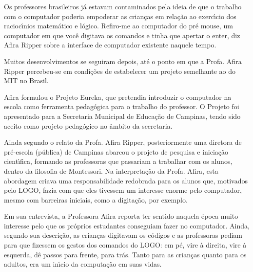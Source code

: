 \documentclass[
12pt,		%
openright,	%
twoside,  %
a4paper,			%
chapter=TITLE,		%
english,			%
french,				%
spanish,			%
brazil				%
]{USPSC-classe/USPSC}
\begin{document}
Os professores brasileiros j\'a estavam contaminados pela ideia de que o trabalho com o computador poderia empoderar as crian\c{c}as em rela\c{c}\~ao ao exerc\'{\i}cio dos racioc\'{\i}nios matem\'atico e l\'ogico. \textquotedbl Refiro-me ao computador do pr\'e mouse, um computador em que voc\^e digitava os comandos e tinha que apertar o enter\textquotedbl , diz Afira Ripper sobre a interface de computador existente naquele tempo.








Muitos desenvolvimentos se seguiram depois, at\'e o ponto em que a Profa. Afira Ripper percebeu-se em condi\c{c}\~oes de estabelecer um projeto semelhante ao do MIT no Brasil.








Afira formulou o Projeto Eureka, que pretendia introduzir o computador na escola como ferramenta pedag\'ogica para o trabalho do professor. O Projeto foi apresentado para a Secretaria Municipal de Educa\c{c}\~ao de Campinas, tendo sido aceito como projeto pedag\'ogico no \^ambito da secretaria.








Ainda segundo o relato da Profa. Afira Ripper, posteriormente uma diretora de pr\'e-escola (p\'ublica) de Campinas abarcou o projeto de pesquisa e inicia\c{c}\~ao cient\'{\i}fica, formando as professoras que passariam a trabalhar com os alunos, dentro da filosofia de Montessori. Na interpreta\c{c}\~ao da Profa. Afira, esta abordagem criava uma responsabilidade redobrada para os alunos que, motivados pelo LOGO, fazia com que eles tivessem um interesse enorme pelo computador, mesmo com barreiras iniciais, como a digita\c{c}\~ao, por exemplo.








Em sua entrevista, a Professora Afira reporta ter sentido naquela \'epoca muito interesse pelo que os pr\'oprios estudantes conseguiam fazer no computador. Ainda, segundo sua descri\c{c}\~ao, as crian\c{c}as digitavam os c\'odigos e as professoras pediam para que fizessem os gestos dos comandos do LOGO: \textquotedbl em p\'e\textquotedbl , \textquotedbl vire \`a direita\textquotedbl , \textquotedbl vire \`a esquerda\textquotedbl , \textquotedbl d\^e passos para frente\textquotedbl , \textquotedbl para tr\'as\textquotedbl . Tanto para as crian\c{c}as quanto para os adultos, era um in\'{\i}cio da computa\c{c}\~ao em suas vidas.
\end{document}
